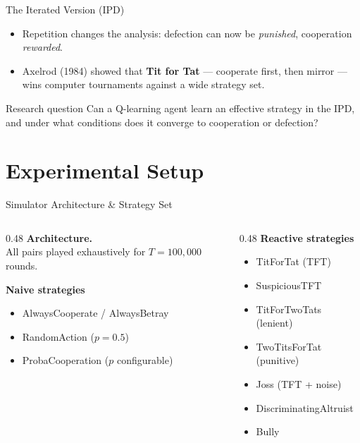 \documentclass[10pt, aspectratio=169]{beamer}
\begin{document}
\begin{frame}{The Iterated Version (IPD)}
  \begin{itemize}
    \item Repetition changes the analysis: defection can now be \emph{punished}, cooperation \emph{rewarded}.
    \item Axelrod (1984) showed that \textbf{Tit for Tat} — cooperate first, then mirror — wins computer tournaments against a wide strategy set.
  \end{itemize}
  \vspace{0.8em}
  \begin{block}{Research question}
    Can a Q-learning agent learn an effective strategy in the IPD, and under what conditions does it converge to cooperation or defection?
  \end{block}
\end{frame}

\section{Experimental Setup}

\begin{frame}{Simulator Architecture \& Strategy Set}
  \begin{columns}[T]
    \begin{column}{0.48\textwidth}
      \textbf{Architecture.}\\
      All pairs played exhaustively for \(T = 100{,}000\) rounds.
      \vspace{0.8em}

      \textbf{Naive strategies}
      \begin{itemize}
        \item AlwaysCooperate / AlwaysBetray
        \item RandomAction (\(p = 0.5\))
        \item ProbaCooperation (\(p\) configurable)
      \end{itemize}
    \end{column}
    \begin{column}{0.48\textwidth}
      \textbf{Reactive strategies}
      \begin{itemize}
        \item TitForTat (TFT)
        \item SuspiciousTFT
        \item TitForTwoTats (lenient)
        \item TwoTitsForTat (punitive)
        \item Joss (TFT + noise)
        \item DiscriminatingAltruist
        \item Bully
      \end{itemize}
    \end{column}
  \end{columns}
\end{frame}
\end{document}
